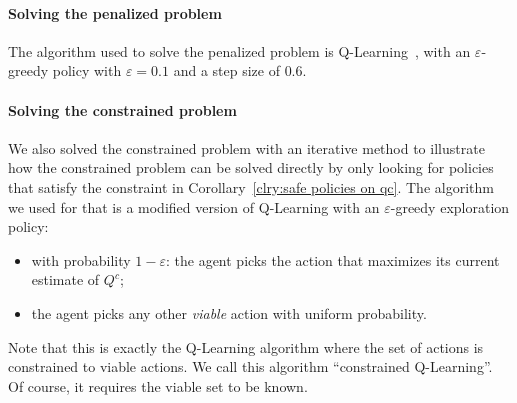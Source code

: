 \paragraph{Solving the penalized problem} The algorithm used to solve the penalized problem is Q-Learning~\cite{watkins1992q}, with an $\varepsilon$-greedy policy with $\varepsilon = 0.1$ and a step size of $0.6$.

\paragraph{Solving the constrained problem} We also solved the constrained problem with an iterative method to illustrate how the constrained problem can be solved directly by only looking for policies that satisfy the constraint in Corollary~\ref{clry:safe policies on qc}. The algorithm we used for that is a modified version of Q-Learning with an $\varepsilon$-greedy exploration policy:
\begin{itemize}
	\item with probability $1-\varepsilon$: the agent picks the action that maximizes its current estimate of $Q^c$;
	\item the agent picks any other\emph{ viable} action with uniform probability.
\end{itemize}
Note that this is exactly the Q-Learning algorithm where the set of actions is constrained to viable actions. We call this algorithm \enquote{constrained Q-Learning}. Of course, it requires the viable set to be known.

